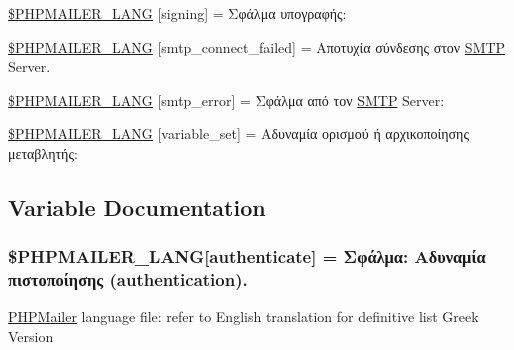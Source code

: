 \begin{DoxyCompactItemize}
\item 
\hyperlink{phpmailer_8lang-el_8php_a68e437bdb9b968a5a67320f03d231565}{\$\+P\+H\+P\+M\+A\+I\+L\+E\+R\+\_\+\+L\+A\+NG} \mbox{[}\textquotesingle{}signing\textquotesingle{}\mbox{]} = \textquotesingle{}Σφάλμα υπογραφής\+: \textquotesingle{}
\item 
\hyperlink{phpmailer_8lang-el_8php_a7b321d4ca1e9df702403ed4c61aa0980}{\$\+P\+H\+P\+M\+A\+I\+L\+E\+R\+\_\+\+L\+A\+NG} \mbox{[}\textquotesingle{}smtp\+\_\+connect\+\_\+failed\textquotesingle{}\mbox{]} = \textquotesingle{}Αποτυχία σύνδεσης στον \hyperlink{class_s_m_t_p}{S\+M\+TP} Server.\textquotesingle{}
\item 
\hyperlink{phpmailer_8lang-el_8php_a7d9cffba1e669c845f8a4c891ee50064}{\$\+P\+H\+P\+M\+A\+I\+L\+E\+R\+\_\+\+L\+A\+NG} \mbox{[}\textquotesingle{}smtp\+\_\+error\textquotesingle{}\mbox{]} = \textquotesingle{}Σφάλμα από τον \hyperlink{class_s_m_t_p}{S\+M\+TP} Server\+: \textquotesingle{}
\item 
\hyperlink{phpmailer_8lang-el_8php_af795debc7a739d038742691c358d9032}{\$\+P\+H\+P\+M\+A\+I\+L\+E\+R\+\_\+\+L\+A\+NG} \mbox{[}\textquotesingle{}variable\+\_\+set\textquotesingle{}\mbox{]} = \textquotesingle{}Αδυναμία ορισμού ή αρχικοποίησης μεταβλητής\+: \textquotesingle{}
\end{DoxyCompactItemize}


\subsection{Variable Documentation}
\subsubsection[{\texorpdfstring{\$\+P\+H\+P\+M\+A\+I\+L\+E\+R\+\_\+\+L\+A\+NG}{$PHPMAILER_LANG}}]{\setlength{\rightskip}{0pt plus 5cm}\$P\+H\+P\+M\+A\+I\+L\+E\+R\+\_\+\+L\+A\+NG\mbox{[}\textquotesingle{}authenticate\textquotesingle{}\mbox{]} =  Σφάλμα\+: Αδυναμία πιστοποίησης (authentication).\textquotesingle{}}\hypertarget{phpmailer_8lang-el_8php_a2cb33073c989b85580748e331ed8b4aa}{}\label{phpmailer_8lang-el_8php_a2cb33073c989b85580748e331ed8b4aa}
\hyperlink{class_p_h_p_mailer}{P\+H\+P\+Mailer} language file\+: refer to English translation for definitive list Greek Version 

